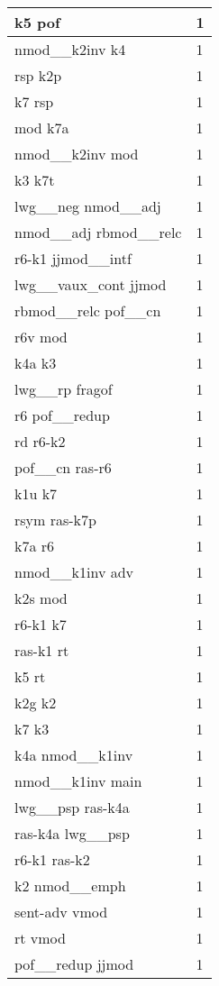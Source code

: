 \documentclass[a4 paper]{article}
\begin{document}
\begin{longtable}{p{}p{}}
k5 pof  & 1 \\ \midrule
nmod\_\_k2inv k4  & 1 \\ \midrule
rsp k2p  & 1 \\ \midrule
k7 rsp  & 1 \\ \midrule
mod k7a  & 1 \\ \midrule
nmod\_\_k2inv mod  & 1 \\ \midrule
k3 k7t  & 1 \\ \midrule
lwg\_\_neg nmod\_\_adj  & 1 \\ \midrule
nmod\_\_adj rbmod\_\_relc  & 1 \\ \midrule
r6-k1 jjmod\_\_intf  & 1 \\ \midrule
lwg\_\_vaux\_cont jjmod  & 1 \\ \midrule
rbmod\_\_relc pof\_\_cn  & 1 \\ \midrule
r6v mod  & 1 \\ \midrule
k4a k3  & 1 \\ \midrule
lwg\_\_rp fragof  & 1 \\ \midrule
r6 pof\_\_redup  & 1 \\ \midrule
rd r6-k2  & 1 \\ \midrule
pof\_\_cn ras-r6  & 1 \\ \midrule
k1u k7  & 1 \\ \midrule
rsym ras-k7p  & 1 \\ \midrule
k7a r6  & 1 \\ \midrule
nmod\_\_k1inv adv  & 1 \\ \midrule
k2s mod  & 1 \\ \midrule
r6-k1 k7  & 1 \\ \midrule
ras-k1 rt  & 1 \\ \midrule
k5 rt  & 1 \\ \midrule
k2g k2  & 1 \\ \midrule
k7 k3  & 1 \\ \midrule
k4a nmod\_\_k1inv  & 1 \\ \midrule
nmod\_\_k1inv main  & 1 \\ \midrule
lwg\_\_psp ras-k4a  & 1 \\ \midrule
ras-k4a lwg\_\_psp  & 1 \\ \midrule
r6-k1 ras-k2  & 1 \\ \midrule
k2 nmod\_\_emph  & 1 \\ \midrule
sent-adv vmod  & 1 \\ \midrule
rt vmod  & 1 \\ \midrule
pof\_\_redup jjmod  & 1 \\ \midrule

\end{longtable}
\end{document}
